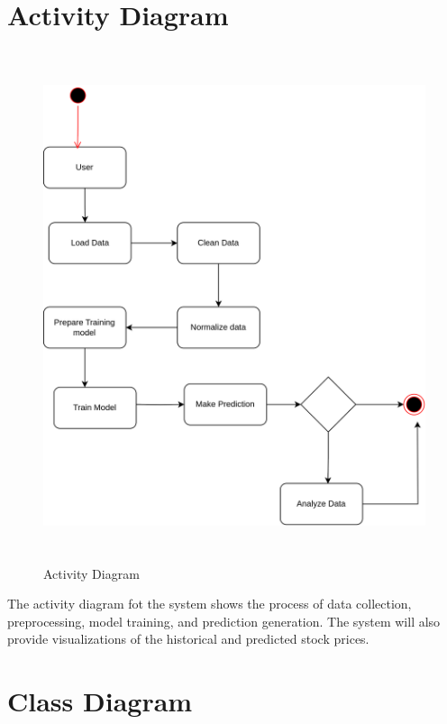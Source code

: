 \documentclass[./main.tex]{subfiles}
\begin{document}
 \section {Activity Diagram}
 \begin{figure}[H]
     \centering
        \includegraphics[width=1\linewidth,height=15cm]{images/activity.png}
     \caption{Activity Diagram}
     \label{fig:4.3}
 \end{figure}
\noindent The activity diagram fot the system shows the process of data collection, preprocessing, model training, and prediction generation. The system will also provide visualizations of the historical and predicted stock prices.
\section{Class Diagram}
\end{document}
